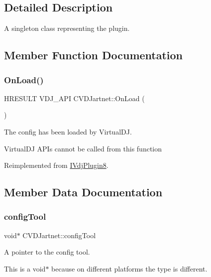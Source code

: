 \subsection{Detailed Description}
A singleton class representing the plugin. 

\subsection{Member Function Documentation}
\mbox{\label{classCVDJartnet_aad029c72cf6bcb2baae197124a1d5493}} 
\subsubsection{\texorpdfstring{On\+Load()}{OnLoad()}}
{\footnotesize\ttfamily H\+R\+E\+S\+U\+LT V\+D\+J\+\_\+\+A\+PI C\+V\+D\+Jartnet\+::\+On\+Load (\begin{DoxyParamCaption}{ }\end{DoxyParamCaption})\hspace{0.3cm}{\ttfamily [virtual]}}



The config has been loaded by Virtual\+DJ. 

Virtual\+DJ A\+P\+Is cannot be called from this function 

Reimplemented from \hyperlink{classIVdjPlugin8}{I\+Vdj\+Plugin8}.



\subsection{Member Data Documentation}
\mbox{\label{classCVDJartnet_ab24b02521183e5d8cf6884e64b3b6e27}} 
\subsubsection{\texorpdfstring{config\+Tool}{configTool}}
{\footnotesize\ttfamily void$\ast$ C\+V\+D\+Jartnet\+::config\+Tool}



A pointer to the config tool. 

This is a void$\ast$ because on different platforms the type is different. \mbox{\label{classCVDJartnet_adef23f780e10ff58e5b24aedde084489}} 
